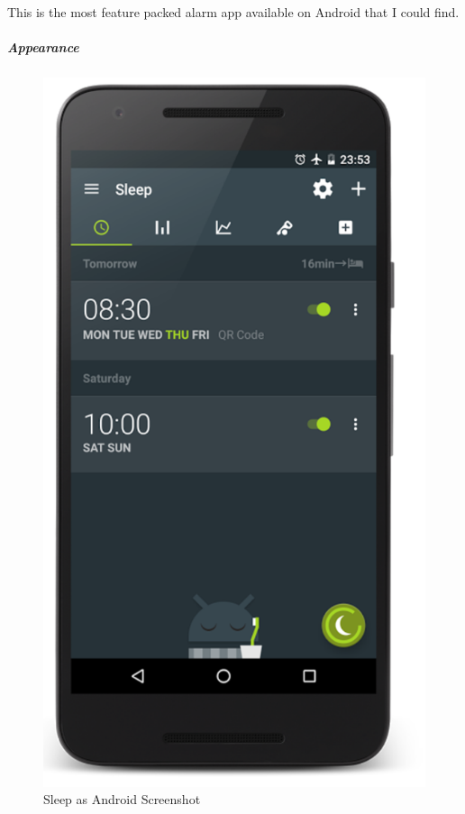 This is the most feature packed alarm app available on Android that I
could find.

\subparagraph{Appearance}\label{appearance}

\begin{figure}[h]
  \begin{center}
    \includegraphics[scale=0.3,keepaspectratio]{Images/sleepas.png}
    \caption{Sleep as Android Screenshot}
  \end{center}
\end{figure}

